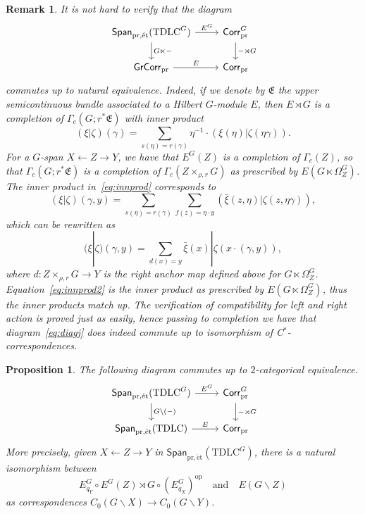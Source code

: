 \documentclass[10pt,a4paper]{amsart}
\newtheorem{proposition}{Proposition}
\newtheorem{remark}{Remark}
\newcommand{\PrCorr}{\mathsf{Corr}_{\mathrm{pr}}}
\newcommand{\PrGrCorr}{\mathsf{GrCorr}_{\mathrm{pr}}}
\newcommand{\Span}{\mathsf{Span}}
\newcommand{\TDLC}{\mathrm{TDLC}}
\newcommand{\pret}{\mathrm{pr,\acute{e}t}}
\begin{document}
\begin{remark}\label{rem:diagj}
It is not hard to verify that the diagram
\begin{equation}\label{eq:diagj}
\begin{tikzcd}
\Span_{\pret}(\TDLC^G) \arrow[r, "E^G"] \arrow[d, "G\ltimes -"] & \PrCorr^G \arrow[d, "- \rtimes G"] \\
\PrGrCorr \arrow[r, "E"]                 & \PrCorr               
\end{tikzcd}
\end{equation}
commutes up to natural equivalence.
Indeed, if we denote by $\mathfrak E$ the upper semicontinuous bundle associated to a Hilbert $G$-module $E$, then $E\rtimes G$ is a completion of $\Gamma_c(G;r^*\mathfrak{E})$ with inner product
\begin{equation}\label{eq:innprod}
(\xi|\zeta) (\gamma)= \sum_{s(\eta)=r(\gamma)} \eta^{-1}\cdot ({\xi}(\eta)|\zeta(\eta\gamma)).
\end{equation}
For a $G$-span $X \leftarrow Z \to Y$, we have that $E^G(Z)$ is a completion of $\Gamma_c(Z)$, so that $\Gamma_c(G;r^*\mathfrak{E})$ is a completion of $\Gamma_c(Z\times_{\rho,r} G)$ as prescribed by $E(G\ltimes \Omega^G_Z)$. The inner product in~\eqref{eq:innprod} corresponds to
\begin{equation*}%
(\xi|\zeta) (\gamma,y)= \sum_{s(\eta)=r(\gamma)} \sum_{f(z)=\eta\cdot y}(\bar{\xi}(z,\eta)|\zeta(z,\eta\gamma)),
\end{equation*}
which can be rewritten as 
\begin{equation}\label{eq:innprod2}
(\xi|\zeta) (\gamma,y)= \sum_{d(x)=y} \bar{\xi}(x)|\zeta(x\cdot (\gamma,y)),
\end{equation}
where $d\colon Z\times_{\rho,r} G\to Y$ is the right anchor map defined above for $G\ltimes \Omega^G_Z$.
Equation~\eqref{eq:innprod2} is the inner product as prescribed by $E(G\ltimes \Omega^G_Z)$, thus the inner products match up. The verification of compatibility for left and right action is proved just as easily, hence passing to completion we have that diagram~\eqref{eq:diagj} does indeed commute up to isomorphism of C$^*$-correspondences.
\end{remark}

\begin{proposition}\label{prop:span-corr-comm}
The following diagram commutes up to $2$-categorical equivalence.
\[
\begin{tikzcd}
\Span_{\pret}(\TDLC^G) \arrow[r, "E^G"] \arrow[d, "G\backslash(-)"] & \PrCorr^G \arrow[d, "- \rtimes G"] \\
\Span_{\pret}(\TDLC) \arrow[r, "E"]                 & \PrCorr               
\end{tikzcd}
\]
More precisely, given  $X \leftarrow Z \to Y$ in $\Span_{\pret}(\TDLC^G)$, there is a natural isomorphism between 
\[
E^G_{q_Y} \circ  E^G(Z)\rtimes G \circ (E^G_{q_X})^{\mathrm{op}}\quad \mathrm{ and } \quad E(G\backslash Z)
\]
as correspondences $C_0(G\backslash X)\to C_0(G\backslash Y)$.
\end{proposition} 
\end{document}
